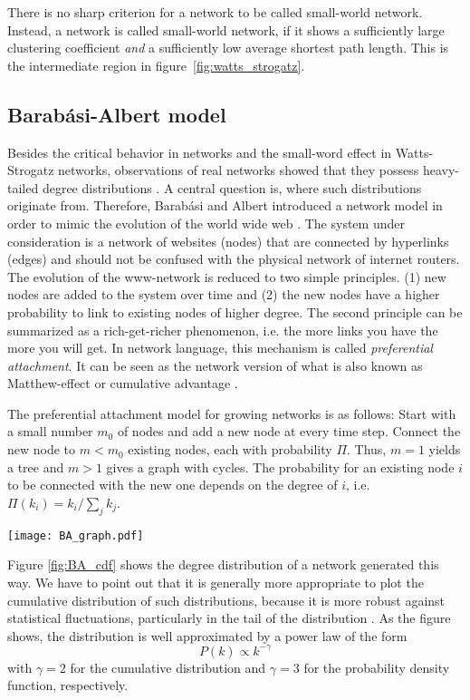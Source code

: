 There is no sharp criterion for a network to be called small-world network.
Instead, a network is called small-world network, if it shows a sufficiently large clustering coefficient \emph{and} a sufficiently low average shortest path length.
This is the intermediate region in figure~\ref{fig:watts_strogatz}. 

\subsection{Barab\'asi-Albert model}\label{sec:BA_model}
Besides the critical behavior in \ER networks and the small-word effect in Watts-Strogatz networks, observations of real networks showed that they possess heavy-tailed degree distributions \citep{Barabasi99,Liljeros:2001p841}.
A central question is, where such distributions originate from.
Therefore, Barab\'asi and Albert introduced a network model in order to mimic the evolution of the world wide web \citep{Barabasi99}.
The system under consideration is a network of websites (nodes) that are connected by hyperlinks (edges) and should not be confused with the physical network of internet routers.
The evolution of the www-network is reduced to two simple principles.
(1) new nodes are added to the system over time and (2) the new nodes have a higher probability to link to existing nodes of higher degree.
The second principle can be summarized as a rich-get-richer phenomenon, i.e. the more links you have the more you will get.
In network language, this mechanism is called \emph{preferential attachment}.
It can be seen as the network version of what is also known as Matthew-effect or cumulative advantage \citep{Merton:1968fh,price:1976}.

The preferential attachment model for growing networks is as follows:
Start with a small number $m_0$ of nodes and add a new node at every time step.
Connect the new node to $m<m_0$ existing nodes, each with probability $\Pi $.
Thus, $m=1$ yields a tree and $m>1$ gives a graph with cycles.
The probability for an existing node $i$ to be connected with the new one depends on the degree of $i$, i.e. $\Pi (k_i)=k_i/\sum _j k_j$.
\begin{SCfigure}
\texttt{[image: BA\_graph.pdf]}
\caption{Cumulative degree distribution of a \BA graph with $N=10^5$ nodes and $m_0=m=5$.
The dashed line shows a power-law $P(k)\propto k^{-2}$.}
\label{fig:BA_cdf}
\end{SCfigure}

Figure \ref{fig:BA_cdf} shows the degree distribution of a network generated this way.
We have to point out that it is generally more appropriate to plot the cumulative distribution of such distributions, because it is more robust against statistical fluctuations, particularly in the tail of the distribution \citep{Clauset:2009}.
As the figure shows, the distribution is well approximated by a power law of the form
\[
P(k)\propto k^{-\gamma }
\]
with $\gamma =2$ for the cumulative distribution and $\gamma = 3$ for the probability density function, respectively.

